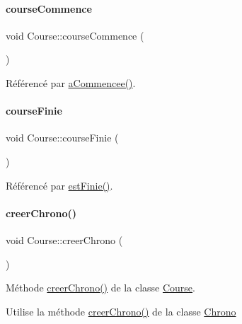 \paragraph{\texorpdfstring{course\+Commence}{courseCommence}}
{\footnotesize\ttfamily void Course\+::course\+Commence (\begin{DoxyParamCaption}{ }\end{DoxyParamCaption})\hspace{0.3cm}{\ttfamily [signal]}}



Référencé par \hyperlink{class_course_a8df970d7150703c3279903b09aa38855}{a\+Commencee()}.

\mbox{\label{class_course_aa66c89bb34e692f17caabb21b11feeb2}} 
\paragraph{\texorpdfstring{course\+Finie}{courseFinie}}
{\footnotesize\ttfamily void Course\+::course\+Finie (\begin{DoxyParamCaption}{ }\end{DoxyParamCaption})\hspace{0.3cm}{\ttfamily [signal]}}



Référencé par \hyperlink{class_course_abbcfaecd40b5ec5e47419068423e767f}{est\+Finie()}.

\mbox{\label{class_course_a6eb96222d8dc1f352e28f36e9b414448}} 
\paragraph{\texorpdfstring{creer\+Chrono()}{creerChrono()}}
{\footnotesize\ttfamily void Course\+::creer\+Chrono (\begin{DoxyParamCaption}{ }\end{DoxyParamCaption})}



Méthode \hyperlink{class_course_a6eb96222d8dc1f352e28f36e9b414448}{creer\+Chrono()} de la classe \hyperlink{class_course}{Course}. 

Utilise la méthode \hyperlink{class_course_a6eb96222d8dc1f352e28f36e9b414448}{creer\+Chrono()} de la classe \hyperlink{class_chrono}{Chrono} 

